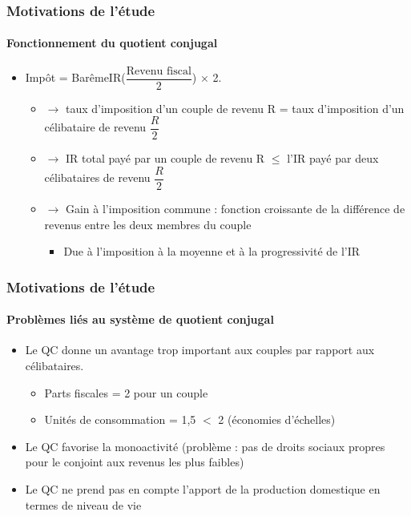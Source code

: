 \documentclass{beamer}
\begin{document}
\begin{frame}
\frametitle{Motivations de l'étude}
\framesubtitle{Fonctionnement du quotient conjugal}

\begin{itemize}

\item Impôt = BarêmeIR($\dfrac{\text{Revenu fiscal}}{2}$) $\times$ 2.

\begin{itemize}

\item $\to$ taux d'imposition d'un couple de revenu R = taux d'imposition d'un célibataire de revenu $\dfrac{R}{2}$

\item $\to$ IR total payé par un couple de revenu R $\leq$ l'IR payé par deux célibataires de revenu $\dfrac{R}{2}$

\item $\to$ Gain à l'imposition commune : fonction croissante de la différence de revenus entre les deux membres du couple

\begin{itemize}

\item Due à l'imposition à la moyenne et à la progressivité de l'IR

\end{itemize}

\end{itemize}

\end{itemize}

\end{frame}

\begin{frame}

\frametitle{Motivations de l'étude}

\framesubtitle{Problèmes liés au système de quotient conjugal}

\begin{itemize}

\item Le QC donne un avantage trop important aux couples par rapport aux célibataires.

\begin{itemize}
\item Parts fiscales = 2 pour un couple
\item Unités de consommation = 1,5 $<$ 2 (économies d'échelles)
\end{itemize}

\item Le QC favorise la monoactivité (problème : pas de droits sociaux propres pour le conjoint aux revenus les plus faibles)

\item Le QC ne prend pas en compte l'apport de la production domestique en termes de niveau de vie

\end{itemize}

\end{frame}
\end{document}
